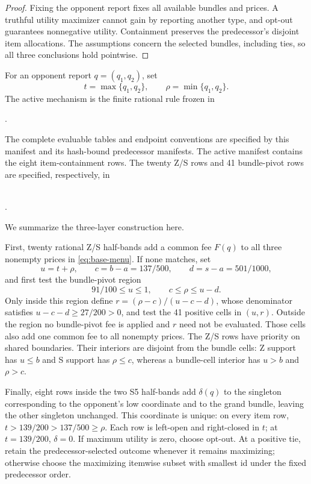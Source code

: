 \documentclass[11pt]{article}
\begin{document}
\begin{proof}
Fixing the opponent report fixes all available bundles and prices.  A
truthful utility maximizer cannot gain by reporting another type, and opt-out
guarantees nonnegative utility.  Containment preserves the predecessor's
disjoint item allocations.  The assumptions concern the selected bundles,
including ties, so all three conclusions hold pointwise.
\end{proof}

For an opponent report \(q=(q_1,q_2)\), set
\[
t=\max\{q_1,q_2\},\qquad \rho=\min\{q_1,q_2\}.
\]
The active mechanism is the finite rational rule frozen in
\begin{center}
.
\end{center}
The complete evaluable tables and endpoint conventions are specified by this
manifest and its hash-bound predecessor manifests.  The active manifest
contains the eight item-containment rows.  The twenty Z/S rows and 41
bundle-pivot rows are specified, respectively, in
\begin{center}\small
{}\\
.
\end{center}
We summarize the three-layer construction here.

First, twenty rational Z/S half-bands add a common fee \(F(q)\) to all three
nonempty prices in \eqref{eq:base-menu}.  If none matches, set
\[
u=t+\rho,\qquad c=b-a=137/500,\qquad d=s-a=501/1000,
\]
and first test the bundle-pivot region
\[
91/100\leq u\leq1,\qquad c\leq\rho\leq u-d.
\]
Only inside this region define \(r=(\rho-c)/(u-c-d)\), whose denominator
satisfies \(u-c-d\geq27/200>0\), and test the 41 positive cells in \((u,r)\).
Outside the region no bundle-pivot fee is applied and \(r\) need not be
evaluated.  Those cells also add one common fee to all nonempty prices.  The Z/S rows have
priority on shared boundaries.  Their interiors are disjoint from the bundle
cells: Z support has \(u\leq b\) and S support has \(\rho\leq c\), whereas a
bundle-cell interior has \(u>b\) and \(\rho>c\).

Finally, eight rows inside the two S5 half-bands add \(\delta(q)\) to the
singleton corresponding to the opponent's low coordinate and to the grand
bundle, leaving the other singleton unchanged.  This coordinate is unique:
on every item row, \(t>139/200>137/500\geq\rho\).  Each row is left-open and
right-closed in \(t\); at \(t=139/200\), \(\delta=0\).  If maximum utility is
zero, choose opt-out.  At a positive tie, retain the predecessor-selected
outcome whenever it remains maximizing; otherwise choose the maximizing
itemwise subset with smallest id under the fixed predecessor order.
\end{document}
